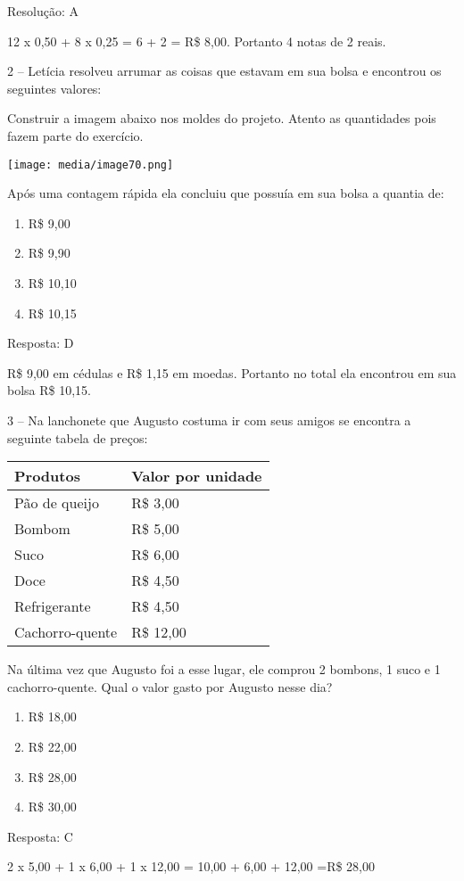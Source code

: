 Resolução: A

12 x 0,50 + 8 x 0,25 = 6 + 2 = R\$ 8,00. Portanto 4 notas de 2 reais.

2 -- Letícia resolveu arrumar as coisas que estavam em sua bolsa e
encontrou os seguintes valores:

Construir a imagem abaixo nos moldes do projeto. \textbar{}Atento as
quantidades pois fazem parte do exercício.

\texttt{[image: media/image70.png]}

Após uma contagem rápida ela concluiu que possuía em sua bolsa a quantia
de:

\begin{enumerate}
\def\labelenumi{\alph{enumi})}
\item
  R\$ 9,00
\item
  R\$ 9,90
\item
  R\$ 10,10
\item
  R\$ 10,15
\end{enumerate}

Resposta: D

R\$ 9,00 em cédulas e R\$ 1,15 em moedas. Portanto no total ela
encontrou em sua bolsa R\$ 10,15.

3 -- Na lanchonete que Augusto costuma ir com seus amigos se encontra a
seguinte tabela de preços:

\begin{longtable}[]{@{}ll@{}}
\toprule
Produtos & Valor por unidade\tabularnewline
\midrule
\endhead
Pão de queijo & R\$ 3,00\tabularnewline
Bombom & R\$ 5,00\tabularnewline
Suco & R\$ 6,00\tabularnewline
Doce & R\$ 4,50\tabularnewline
Refrigerante & R\$ 4,50\tabularnewline
Cachorro-quente & R\$ 12,00\tabularnewline
\bottomrule
\end{longtable}

Na última vez que Augusto foi a esse lugar, ele comprou 2 bombons, 1
suco e 1 cachorro-quente. Qual o valor gasto por Augusto nesse dia?

\begin{enumerate}
\def\labelenumi{\alph{enumi})}
\item
  R\$ 18,00
\item
  R\$ 22,00
\item
  R\$ 28,00
\item
  R\$ 30,00
\end{enumerate}

Resposta: C

2 x 5,00 + 1 x 6,00 + 1 x 12,00 = 10,00 + 6,00 + 12,00 =R\$ 28,00


